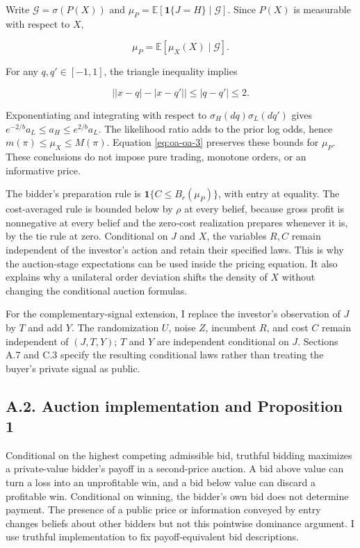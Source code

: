 \documentclass[
  11pt,
]{article}
\begin{document}
Write \(\mathcal G=\sigma(P(X))\) and
\(\mu_P=\mathbb E[\mathbf1\{J=H\}\mid\mathcal G]\). Since \(P(X)\)
is measurable with respect to \(X\),

\[
\mu_P=\mathbb E[\mu_X(X)\mid\mathcal G].
\tag{OA.3}\label{eq:oa-oa-3}
\]

For any \(q,q'\in[-1,1]\), the triangle inequality implies

\[
\left||x-q|-|x-q'|\right|\le|q-q'|\le2.
\tag{OA.4}\label{eq:oa-oa-4}
\]

Exponentiating and integrating with respect to
\(\sigma_H(dq)\sigma_L(dq')\) gives
\(e^{-2/b}a_L\le a_H\le e^{2/b}a_L\). The likelihood ratio adds to the
prior log odds, hence \(m(\pi)\le\mu_X\le M(\pi)\). Equation
\eqref{eq:oa-oa-3} preserves these bounds for \(\mu_P\). These
conclusions do not impose pure trading, monotone orders, or an
informative price.

The bidder's preparation rule is \(\mathbf1\{C\le B_r(\mu_P)\}\), with
entry at equality. The cost-averaged rule is
bounded below by \(\rho\) at every belief, because gross profit is
nonnegative at every belief and the zero-cost realization prepares
whenever it is, by the tie rule at zero. Conditional on \(J\) and \(X\), the
variables \(R,C\) remain independent of the investor's action and retain
their specified laws. This is why the auction-stage expectations can be
used inside the pricing equation. It also explains why a unilateral
order deviation shifts the density of \(X\) without changing the
conditional auction formulas.

For the complementary-signal extension, I replace the investor's
observation of \(J\) by \(T\) and add \(Y\). The randomization
\(U\), noise \(Z\), incumbent \(R\), and cost \(C\) remain independent
of \((J,T,Y)\); \(T\) and \(Y\) are independent conditional on
\(J\). Sections A.7 and C.3 specify the resulting conditional laws
rather than treating the buyer's private signal as public.

\subsection{A.2. Auction implementation and Proposition
1}\label{oa-a-payoffs}

Conditional on the highest competing admissible bid, truthful bidding
maximizes a private-value bidder's payoff in a second-price auction. A
bid above value can turn a loss into an unprofitable win, and a bid
below value can discard a profitable win. Conditional on winning, the
bidder's own bid does not determine payment. The presence of a public
price or information conveyed by entry changes beliefs about other
bidders but not this pointwise dominance argument. I use truthful
implementation to fix payoff-equivalent bid descriptions.
\end{document}
